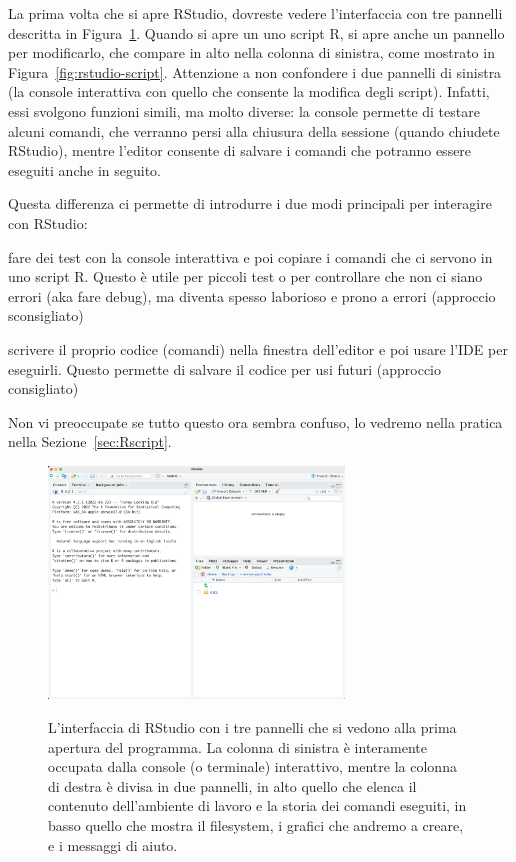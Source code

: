 La prima volta che si apre RStudio, dovreste vedere l'interfaccia con tre pannelli descritta in Figura~\ref{fig:rstudio}. Quando si apre un uno script R, si apre anche un pannello per modificarlo, che compare in alto nella colonna di sinistra, come mostrato in Figura~\ref{fig:rstudio-script}. Attenzione a non confondere i due pannelli di sinistra (la console interattiva con quello che consente la modifica degli script). Infatti, essi svolgono funzioni simili, ma molto diverse: la console permette di testare alcuni comandi, che verranno persi alla chiusura della sessione (quando chiudete RStudio), mentre l'editor consente di salvare i comandi che potranno essere eseguiti anche in seguito. 

\noindent Questa differenza ci permette di introdurre i due modi principali per interagire con RStudio:

\begin{myenumerate}
	\item fare dei test con la console interattiva e poi copiare i comandi che ci servono in uno script R. Questo \`e utile per piccoli test o per controllare che non ci siano errori (aka fare debug), ma diventa spesso laborioso e prono a errori (approccio sconsigliato)
	\item scrivere il proprio codice (comandi) nella finestra dell'editor e poi usare l'IDE per eseguirli. Questo permette di salvare il codice per usi futuri (approccio consigliato)
\end{myenumerate}

\noindent Non vi preoccupate se tutto questo ora sembra confuso, lo vedremo nella pratica nella Sezione~\ref{sec:Rscript}.

\begin{figure}[h]
 \centering
  \includegraphics[width=0.7\textwidth]{images/01-rstudio.png}
  \label{fig:rstudio}
 \caption{L'interfaccia di RStudio con i tre pannelli che si vedono alla prima apertura del programma. La colonna di sinistra \`e interamente occupata dalla console (o terminale) interattivo, mentre la colonna di destra \`e divisa in due pannelli, in alto quello che elenca il contenuto dell'ambiente di lavoro e la storia dei comandi eseguiti, in basso quello che mostra il filesystem, i grafici che andremo a creare, e i messaggi di aiuto.}
\end{figure}


